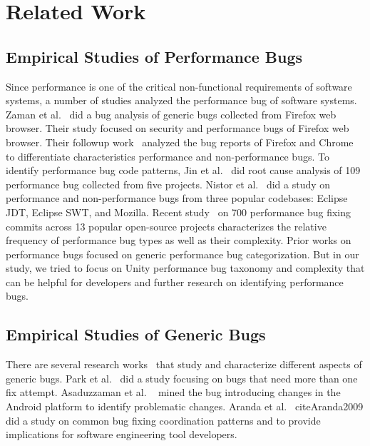 \chapter{Related Work}
\label{chap:relatedwork}

\section{Empirical Studies of Performance Bugs}
\label{sec:empperformance}
Since performance is one of the critical non-functional requirements of software systems, a number of studies analyzed the performance bug of software systems. Zaman et al.~\cite{zaman_security_2011} did a bug analysis of generic bugs collected from Firefox web browser. Their study focused on security and performance bugs of Firefox web browser. Their followup work~\cite{Zaman_study_2012} analyzed the bug reports of Firefox and Chrome to differentiate characteristics performance and non-performance bugs. To identify performance bug code patterns, Jin et al.~\cite{Jin_performance_2012} did root cause analysis of 109 performance bug collected from five projects. Nistor et al.~\cite{Nistor_performance_2013} did a study on performance and non-performance bugs from three popular codebases: Eclipse JDT, Eclipse SWT, and Mozilla. Recent study~\cite{Chen:perf:19} on 700 performance bug fixing commits across 13 popular open-source projects characterizes the relative frequency of performance bug types as well as their complexity. Prior works on performance bugs focused on generic performance bug categorization. But in our study, we tried to focus on Unity performance bug taxonomy and complexity that can be helpful for developers and further research on identifying performance bugs.


\section{Empirical Studies of Generic Bugs}
\label{sec:genericbug}
There are several research works~\cite{Fonseca2010, Lu2008, Sahoo2010} that study and characterize different aspects of generic bugs. Park et al.~\cite{Park2012} did a study focusing on bugs that need more than one fix attempt. Asaduzzaman et al. ~\cite{Asaduzzaman2012} mined the bug introducing changes in the Android platform to identify problematic changes. Aranda et al. ~cite{Aranda2009} did a study on common bug fixing coordination patterns and to provide implications for software engineering tool developers.


